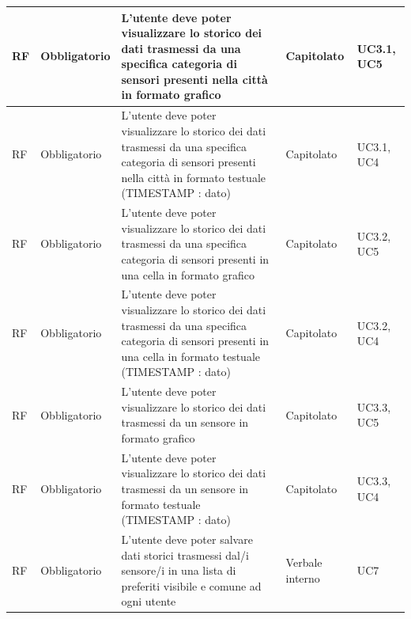 \documentclass{article}
\begin{document}
\begin{longtable}{|C{1cm}|C{2cm}|>{\raggedright}m{5cm}|C{1.5cm}|C{2cm}|}
    \hline
     RF & Obbligatorio        & L'utente deve poter visualizzare lo storico dei dati trasmessi da una specifica categoria di sensori presenti nella città in formato grafico                                                                                       & Capitolato      & UC3.1, UC5               \\
    \hline
     RF & Obbligatorio        & L'utente deve poter visualizzare lo storico dei dati trasmessi da una specifica categoria di sensori presenti nella \newline città in formato testuale (TIMESTAMP : dato)                                                          & Capitolato & UC3.1, UC4                   \\
    \hline
     RF & Obbligatorio        & L'utente deve poter visualizzare lo storico dei dati trasmessi da una specifica categoria di sensori presenti in una cella in formato grafico                                                                                      & Capitolato      & UC3.2, UC5             \\
    \hline
     RF & Obbligatorio        & L'utente deve poter visualizzare lo storico dei dati trasmessi da una specifica categoria di sensori presenti in \newline una cella in formato testuale (TIMESTAMP : dato)                                                         & Capitolato & UC3.2, UC4                \\
    \hline
     RF & Obbligatorio        & L'utente deve poter visualizzare lo storico dei dati trasmessi da un sensore in formato grafico                                                                                                                                    & Capitolato & UC3.3, UC5                 \\
    \hline
     RF & Obbligatorio        & L'utente deve poter visualizzare lo storico dei dati trasmessi da un sensore in formato testuale (TIMESTAMP : dato)                                                                                                                & Capitolato & UC3.3, UC4            \\
    \hline
     RF & Obbligatorio        & L'utente deve poter salvare dati storici trasmessi dal/i sensore/i in una lista di preferiti visibile e comune ad ogni utente                                & Verbale interno & UC7               \\

\end{longtable}
\end{document}
